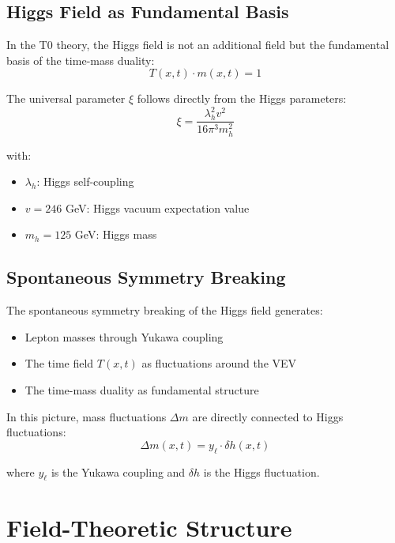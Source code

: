 	\subsection{Higgs Field as Fundamental Basis}
	
	In the T0 theory, the Higgs field is not an additional field but the fundamental basis of the time-mass duality:
	\begin{equation}
		T(x,t) \cdot m(x,t) = 1
		\label{eq:higgs_foundation}
	\end{equation}
	
	The universal parameter $\xi$ follows directly from the Higgs parameters:
	\begin{equation}
		\boxed{\xi = \frac{\lambda_h^2 v^2}{16\pi^3 m_h^2}}
		\label{eq:xi_from_higgs}
	\end{equation}
	
	with:
	\begin{itemize}
		\item $\lambda_h$: Higgs self-coupling
		\item $v = 246$ GeV: Higgs vacuum expectation value
		\item $m_h = 125$ GeV: Higgs mass
	\end{itemize}
	
	\subsection{Spontaneous Symmetry Breaking}
	
	The spontaneous symmetry breaking of the Higgs field generates:
	\begin{itemize}
		\item Lepton masses through Yukawa coupling
		\item The time field $T(x,t)$ as fluctuations around the VEV
		\item The time-mass duality as fundamental structure
	\end{itemize}
	
	In this picture, mass fluctuations $\Delta m$ are directly connected to Higgs fluctuations:
	\begin{equation}
		\Delta m(x,t) = y_\ell \cdot \delta h(x,t)
		\label{eq:higgs_fluctuation}
	\end{equation}
	
	where $y_\ell$ is the Yukawa coupling and $\delta h$ is the Higgs fluctuation.
	
	\section{Field-Theoretic Structure}
	
